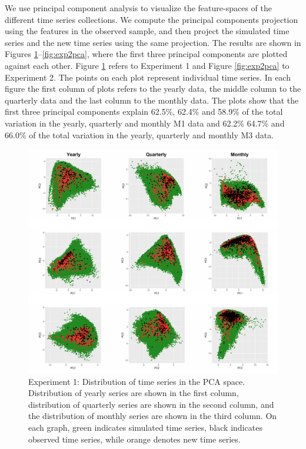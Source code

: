 \documentclass[11pt,a4paper,]{article}
\begin{document}
We use principal component analysis to visualize the feature-spaces of the different time series collections. We compute the principal components projection using the features in the observed sample, and then project the simulated time series and the new time series using the same projection. The results are shown in Figures \ref{fig:exp1pca}--\ref{fig:exp2pca}, where the first three principal components are plotted against each other. Figure \ref{fig:exp1pca} refers to Experiment 1 and Figure \ref{fig:exp2pca} to Experiment 2. The points on each plot represent individual time series. In each figure the first column of plots refers to the yearly data, the middle column to the quarterly data and the last column to the monthly data. The plots show that the first three principal components explain 62.5\%, 62.4\% and 58.9\% of the total variation in the yearly, quarterly and monthly M1 data and 62.2\% 64.7\% and 66.0\% of the total variation in the yearly, quarterly and monthly M3 data.

\begin{figure}

{\centering \includegraphics[width=\textwidth]{figure/exp1pca-1} 

}

\caption{Experiment 1: Distribution of time series in the PCA space. Distribution of yearly series are shown in the first column, distribution of quarterly series are shown in the second column, and the distribution of monthly series are shown in the third column. On each graph, green indicates simulated time series, black indicates observed time series, while orange denotes new time series.}\label{fig:exp1pca}
\end{figure}
\end{document}
